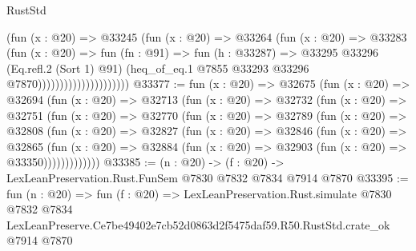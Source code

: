\begin{lexlean}{RustStd}
\begin{coremodule}
                                    (fun (x : @20) =>
                                    @33245
                                      (fun (x : @20) =>
                                      @33264
                                        (fun (x : @20) =>
                                        @33283
                                          (fun (x : @20) =>
                                          fun (fn : @91) =>
                                          fun (h : @33287) =>
                                          @33295
                                            @33296
                                            (Eq.refl.{2} (Sort 1) @91)
                                            (heq_of_eq.{1}
                                              @7855
                                              @33293
                                              @33296
                                              @7870)))))))))))))))))))))
@33377 := fun (x : @20) =>
  @32675
    (fun (x : @20) =>
    @32694
      (fun (x : @20) =>
      @32713
        (fun (x : @20) =>
        @32732
          (fun (x : @20) =>
          @32751
            (fun (x : @20) =>
            @32770
              (fun (x : @20) =>
              @32789
                (fun (x : @20) =>
                @32808
                  (fun (x : @20) =>
                  @32827
                    (fun (x : @20) =>
                    @32846
                      (fun (x : @20) =>
                      @32865
                        (fun (x : @20) =>
                        @32884 (fun (x : @20) => @32903 (fun (x : @20) => @33350)))))))))))))
@33385 := (n : @20) -> (f : @20) -> LexLeanPreservation.Rust.FunSem @7830 @7832 @7834 @7914 @7870
@33395 := fun (n : @20) =>
  fun (f : @20) =>
  LexLeanPreservation.Rust.simulate
    @7830
    @7832
    @7834
    LexLeanPreserve.Ce7be49402e7cb52d0863d2f5475daf59.R50.RustStd.crate_ok
    @7914
    @7870
\end{coremodule}
\end{lexlean}

